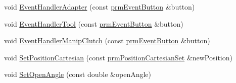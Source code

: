 \begin{DoxyCompactItemize}
\item 
void \hyperlink{classmts_intuitive_research_kit_p_s_m_a3416ba243d970650e66064bbef2ef8ac}{Event\+Handler\+Adapter} (const \hyperlink{classprm_event_button}{prm\+Event\+Button} \&button)
\item 
void \hyperlink{classmts_intuitive_research_kit_p_s_m_a7f74e9da087a2c7b138b04aa42783a49}{Event\+Handler\+Tool} (const \hyperlink{classprm_event_button}{prm\+Event\+Button} \&button)
\item 
void \hyperlink{classmts_intuitive_research_kit_p_s_m_ac4b7ad0ac81d86b6203da137033d6fef}{Event\+Handler\+Manip\+Clutch} (const \hyperlink{classprm_event_button}{prm\+Event\+Button} \&button)
\item 
void \hyperlink{classmts_intuitive_research_kit_p_s_m_abac993df2c49f0bfbd6fd25d357d5ba2}{Set\+Position\+Cartesian} (const \hyperlink{classprm_position_cartesian_set}{prm\+Position\+Cartesian\+Set} \&new\+Position)
\item 
void \hyperlink{classmts_intuitive_research_kit_p_s_m_a93771d004cedc6c6f94b6ac5f91bff91}{Set\+Open\+Angle} (const double \&open\+Angle)
\end{DoxyCompactItemize}
